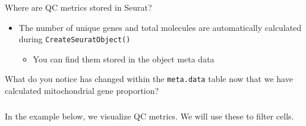 \documentclass[
]{book}
\providecommand{\tightlist}{%
  \setlength{\itemsep}{0pt}\setlength{\parskip}{0pt}}
\begin{document}
Where are QC metrics stored in Seurat?

\begin{itemize}
\tightlist
\item
  The number of unique genes and total molecules are automatically calculated during \texttt{CreateSeuratObject()}

  \begin{itemize}
  \tightlist
  \item
    You can find them stored in the object meta data
  \end{itemize}
\end{itemize}

What do you notice has changed within the \texttt{meta.data} table now that we have calculated mitochondrial gene proportion?

\subsubsection*{}\label{section-2}

In the example below, we visualize QC metrics. We will use these to filter cells.
\end{document}

